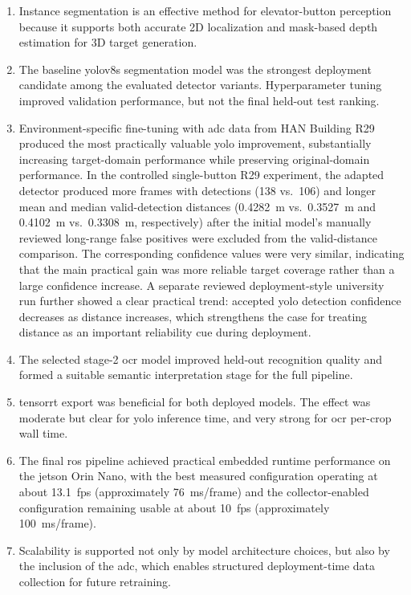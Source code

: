 \begin{enumerate}
    \item Instance segmentation is an effective method for elevator-button perception because it supports both accurate 2D localization and mask-based depth estimation for 3D target generation.
    \item The baseline \gls{yolo}v8s segmentation model was the strongest deployment candidate among the evaluated detector variants. Hyperparameter tuning improved validation performance, but not the final held-out test ranking.
    \item Environment-specific fine-tuning with \gls{adc} data from HAN Building R29 produced the most practically valuable \gls{yolo} improvement, substantially increasing target-domain performance while preserving original-domain performance. In the controlled single-button R29 experiment, the adapted detector produced more frames with detections (138 vs.\ 106) and longer mean and median valid-detection distances (0.4282~m vs.\ 0.3527~m and 0.4102~m vs.\ 0.3308~m, respectively) after the initial model's manually reviewed long-range false positives were excluded from the valid-distance comparison. The corresponding confidence values were very similar, indicating that the main practical gain was more reliable target coverage rather than a large confidence increase. A separate reviewed deployment-style university run further showed a clear practical trend: accepted \gls{yolo} detection confidence decreases as distance increases, which strengthens the case for treating distance as an important reliability cue during deployment.
    \item The selected stage-2 \gls{ocr} model improved held-out recognition quality and formed a suitable semantic interpretation stage for the full pipeline.
    \item \gls{tensorrt} export was beneficial for both deployed models. The effect was moderate but clear for \gls{yolo} inference time, and very strong for \gls{ocr} per-crop wall time.
    \item The final \gls{ros} pipeline achieved practical embedded runtime performance on the \gls{jetson} Orin Nano, with the best measured configuration operating at about 13.1~\gls{fps} (approximately 76~ms/frame) and the collector-enabled configuration remaining usable at about 10~\gls{fps} (approximately 100~ms/frame).
    \item Scalability is supported not only by model architecture choices, but also by the inclusion of the \gls{adc}, which enables structured deployment-time data collection for future retraining.
\end{enumerate}

